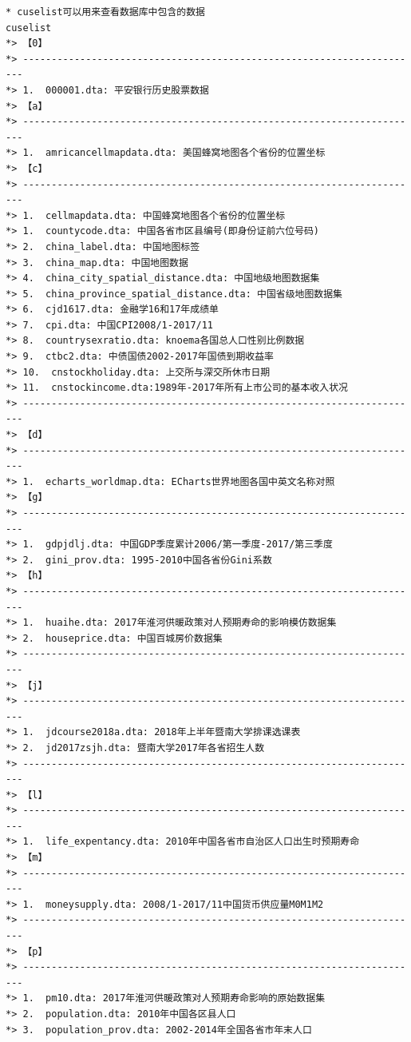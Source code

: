 \documentclass[]{ctexbook}
\begin{document}
\begin{lstlisting}
* cuselist可以用来查看数据库中包含的数据
cuselist
*> 【0】
*> ----------------------------------------------------------------------
*> 1.  000001.dta: 平安银行历史股票数据
*> 【a】
*> ----------------------------------------------------------------------
*> 1.  amricancellmapdata.dta: 美国蜂窝地图各个省份的位置坐标
*> 【c】
*> ----------------------------------------------------------------------
*> 1.  cellmapdata.dta: 中国蜂窝地图各个省份的位置坐标
*> 1.  countycode.dta: 中国各省市区县编号(即身份证前六位号码)
*> 2.  china_label.dta: 中国地图标签
*> 3.  china_map.dta: 中国地图数据
*> 4.  china_city_spatial_distance.dta: 中国地级地图数据集
*> 5.  china_province_spatial_distance.dta: 中国省级地图数据集
*> 6.  cjd1617.dta: 金融学16和17年成绩单
*> 7.  cpi.dta: 中国CPI2008/1-2017/11
*> 8.  countrysexratio.dta: knoema各国总人口性别比例数据
*> 9.  ctbc2.dta: 中债国债2002-2017年国债到期收益率
*> 10.  cnstockholiday.dta: 上交所与深交所休市日期
*> 11.  cnstockincome.dta:1989年-2017年所有上市公司的基本收入状况
*> ----------------------------------------------------------------------
*> 【d】
*> ----------------------------------------------------------------------
*> 1.  echarts_worldmap.dta: ECharts世界地图各国中英文名称对照
*> 【g】
*> ----------------------------------------------------------------------
*> 1.  gdpjdlj.dta: 中国GDP季度累计2006/第一季度-2017/第三季度
*> 2.  gini_prov.dta: 1995-2010中国各省份Gini系数
*> 【h】
*> ----------------------------------------------------------------------
*> 1.  huaihe.dta: 2017年淮河供暖政策对人预期寿命的影响模仿数据集
*> 2.  houseprice.dta: 中国百城房价数据集
*> ----------------------------------------------------------------------
*> 【j】
*> ----------------------------------------------------------------------
*> 1.  jdcourse2018a.dta: 2018年上半年暨南大学排课选课表
*> 2.  jd2017zsjh.dta: 暨南大学2017年各省招生人数
*> ----------------------------------------------------------------------
*> 【l】
*> ----------------------------------------------------------------------
*> 1.  life_expentancy.dta: 2010年中国各省市自治区人口出生时预期寿命
*> 【m】
*> ----------------------------------------------------------------------
*> 1.  moneysupply.dta: 2008/1-2017/11中国货币供应量M0M1M2
*> ----------------------------------------------------------------------
*> 【p】
*> ----------------------------------------------------------------------
*> 1.  pm10.dta: 2017年淮河供暖政策对人预期寿命影响的原始数据集
*> 2.  population.dta: 2010年中国各区县人口
*> 3.  population_prov.dta: 2002-2014年全国各省市年末人口

\end{lstlisting}
\end{document}
